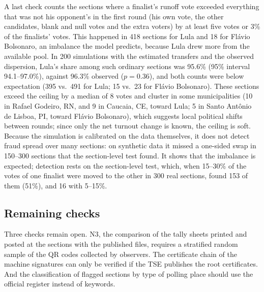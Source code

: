 A last check counts the sections where a finalist's runoff vote exceeded
everything that was not his opponent's in the first round (his own vote,
the other candidates, blank and null votes and the extra voters) by at least
five votes or 3\% of the finalists' votes. This happened in 418 sections for
Lula and 18 for Fl\'avio Bolsonaro, an imbalance the model predicts, because
Lula drew more from the available pool. In 200 simulations with the
estimated transfers and the observed dispersion, Lula's share among such
ordinary sections was 95.6\% (95\% interval 94.1--97.0\%), against 96.3\%
observed ($p=0.36$), and both counts were below expectation (395 vs.\ 491
for Lula; 15 vs.\ 23 for Fl\'avio Bolsonaro). These sections exceed the
ceiling by a median of 8 votes and cluster in some municipalities (10 in
Rafael Godeiro, RN, and 9 in Caucaia, CE, toward Lula; 5 in Santo Ant\^onio
de Lisboa, PI, toward Fl\'avio Bolsonaro), which suggests local political
shifts between rounds; since only the net turnout change is known, the
ceiling is soft. Because the simulation is calibrated on the data
themselves, it does not detect fraud spread over many sections: on
synthetic data it missed a one-sided swap in 150--300 sections that the
section-level test found. It shows that the imbalance is expected;
detection rests on the section-level test, which, when 15--30\% of the
votes of one finalist were moved to the other in 300 real sections, found
153 of them (51\%), and 16 with 5--15\%.

\subsection{Remaining checks}

Three checks remain open. N3, the comparison of the tally sheets printed and
posted at the sections with the published files, requires a stratified
random sample of the QR codes collected by observers. The certificate chain
of the machine signatures can only be verified if the TSE publishes the root
certificates. And the classification of flagged sections by type of polling
place should use the official register instead of keywords.


